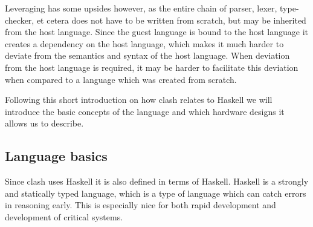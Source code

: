 Leveraging has some upsides however, as the entire chain of parser, lexer, type-checker, et cetera does not have to be written from scratch, but may be inherited from the host language.
Since the guest language is bound to the host language it creates a dependency on the host language, which makes it much harder to deviate from the semantics and syntax of the host language.
When deviation from the host language is required, it may be harder to facilitate this deviation when compared to a language which was created from scratch. 

Following this short introduction on how \gls{clash} relates to Haskell we will introduce the basic concepts of the language and which hardware designs it allows us to describe.

\subsection{Language basics} 
Since \gls{clash} uses Haskell it is also defined in terms of Haskell. 
Haskell is a strongly and statically typed language, which is a type of language which can catch errors in reasoning early.
This is especially nice for both rapid development and development of critical systems.

